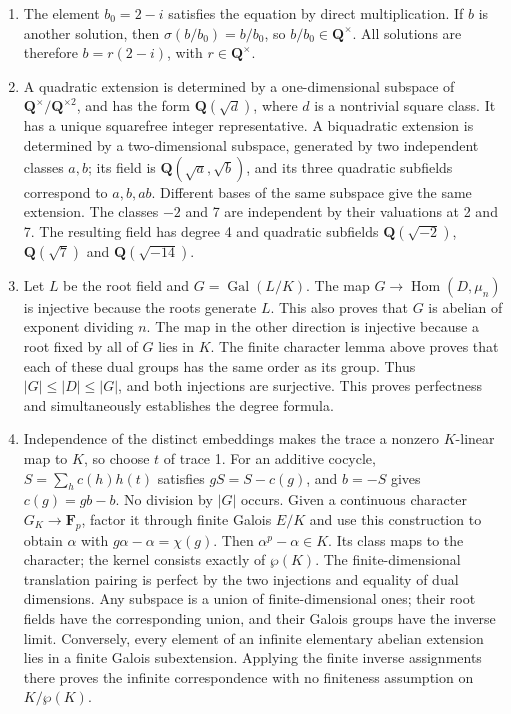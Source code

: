 \documentclass[11pt,a4paper]{article}
\newcommand{\tightlist}{\setlength{\itemsep}{0pt}\setlength{\parskip}{0pt}}
\begin{document}
\begin{enumerate}
\def\labelenumi{\arabic{enumi}.}
\tightlist
\item
  The element \(b_0=2-i\) satisfies the equation by direct
  multiplication. If \(b\) is another solution, then
  \(\sigma(b/b_0)=b/b_0\), so \(b/b_0\in\mathbf Q^\times\). All
  solutions are therefore \(b=r(2-i)\), with \(r\in\mathbf Q^\times\).
\item
  A quadratic extension is determined by a one-dimensional subspace of
  \(\mathbf Q^\times/\mathbf Q^{\times2}\), and has the form
  \(\mathbf Q(\sqrt d)\), where \(d\) is a nontrivial square class. It
  has a unique squarefree integer representative. A biquadratic
  extension is determined by a two-dimensional subspace, generated by
  two independent classes \(a,b\); its field is
  \(\mathbf Q(\sqrt a,\sqrt b)\), and its three quadratic subfields
  correspond to \(a,b,ab\). Different bases of the same subspace give
  the same extension. The classes \(-2\) and 7 are independent by their
  valuations at 2 and 7. The resulting field has degree 4 and quadratic
  subfields \(\mathbf Q(\sqrt{-2})\), \(\mathbf Q(\sqrt7)\) and
  \(\mathbf Q(\sqrt{-14})\).
\item
  Let \(L\) be the root field and \(G=\operatorname{Gal}(L/K)\). The map
  \(G\to\operatorname{Hom}(D,\mu_n)\) is injective because the roots
  generate \(L\). This also proves that \(G\) is abelian of exponent
  dividing \(n\). The map in the other direction is injective because a
  root fixed by all of \(G\) lies in \(K\). The finite character lemma
  above proves that each of these dual groups has the same order as its
  group. Thus \(|G|\leq|D|\leq|G|\), and both injections are surjective.
  This proves perfectness and simultaneously establishes the degree
  formula.
\item
  Independence of the distinct embeddings makes the trace a nonzero
  \(K\)-linear map to \(K\), so choose \(t\) of trace 1. For an additive
  cocycle, \(S=\sum_h c(h)h(t)\) satisfies \(gS=S-c(g)\), and \(b=-S\)
  gives \(c(g)=gb-b\). No division by \(|G|\) occurs. Given a continuous
  character \(G_K\to\mathbf F_p\), factor it through finite Galois
  \(E/K\) and use this construction to obtain \(\alpha\) with
  \(g\alpha-\alpha=\chi(g)\). Then \(\alpha^p-\alpha\in K\). Its class
  maps to the character; the kernel consists exactly of \(\wp(K)\). The
  finite-dimensional translation pairing is perfect by the two
  injections and equality of dual dimensions. Any subspace is a union of
  finite-dimensional ones; their root fields have the corresponding
  union, and their Galois groups have the inverse limit. Conversely,
  every element of an infinite elementary abelian extension lies in a
  finite Galois subextension. Applying the finite inverse assignments
  there proves the infinite correspondence with no finiteness assumption
  on \(K/\wp(K)\).
\end{enumerate}
\end{document}

